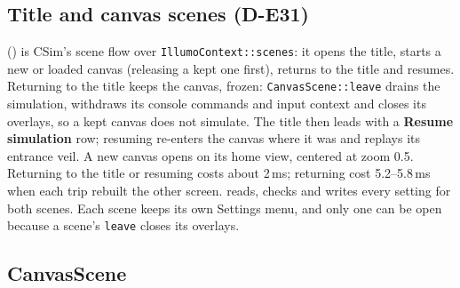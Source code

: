 \subsection{Title and canvas scenes (D-E31)}

 () is
CSim's scene flow over \texttt{IllumoContext::scenes}: it opens the title,
starts a new or loaded canvas (releasing a kept one first), returns to the
title and resumes. Returning to the title keeps the canvas, frozen:
\texttt{CanvasScene::leave} drains the simulation, withdraws its console
commands and input context and closes its overlays, so a kept canvas does not
simulate. The title then leads with a \textbf{Resume simulation} row; resuming
re-enters the canvas where it was and replays its entrance veil. A new canvas
opens on its home view, centered at zoom 0.5. Returning to the title or
resuming costs about 2\,ms; returning cost 5.2--5.8\,ms when each trip rebuilt
the other screen.
 reads, checks and writes every setting for both
scenes. Each scene keeps its own Settings menu, and only one can be open
because a scene's \texttt{leave} closes its overlays.

\subsection{CanvasScene}

